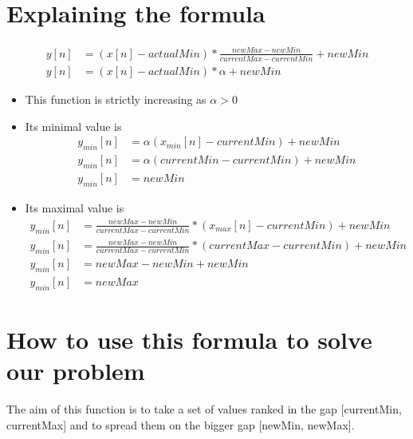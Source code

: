 \documentclass[a4paper]{article}
\begin{document}
\section{Explaining the formula}
	\begin{equation*}
	\begin{aligned}
	y[n] &= (x[n] - actualMin) *\frac{newMax - newMin}{currentMax - currentMin} + newMin\\
    y[n] &= (x[n] - actualMin) * \alpha + newMin
	\end{aligned}
	\end{equation*}
    
    \begin{itemize}
		\item This function is strictly increasing as $\alpha > 0$
        \item Its minimal value is 
        	\begin{equation*}
			\begin{aligned}
				y_{min}[n] &= \alpha (x_{min}[n] - currentMin) + newMin \\
				y_{min}[n] &= \alpha (currentMin - currentMin) + newMin \\
				y_{min}[n] &= newMin
			\end{aligned}
			\end{equation*}
        \item Its maximal value is
        	\begin{equation*}
			\begin{aligned}
				y_{min}[n] &= \frac{newMax - newMin}{currentMax - currentMin} * (x_{max}[n] - currentMin) + newMin\\
				y_{min}[n] &= \frac{newMax - newMin}{currentMax - currentMin} * (currentMax - currentMin) + newMin\\
				y_{min}[n] &= newMax - newMin + newMin\\
				y_{min}[n] &= newMax
            \end{aligned}
            \end{equation*}
	\end{itemize}




\section{How to use this formula to solve our problem}
	The aim of this function is to take a set of values ranked in the gap [currentMin, currentMax] and to spread them on the bigger gap [newMin, newMax].\\
\end{document}
